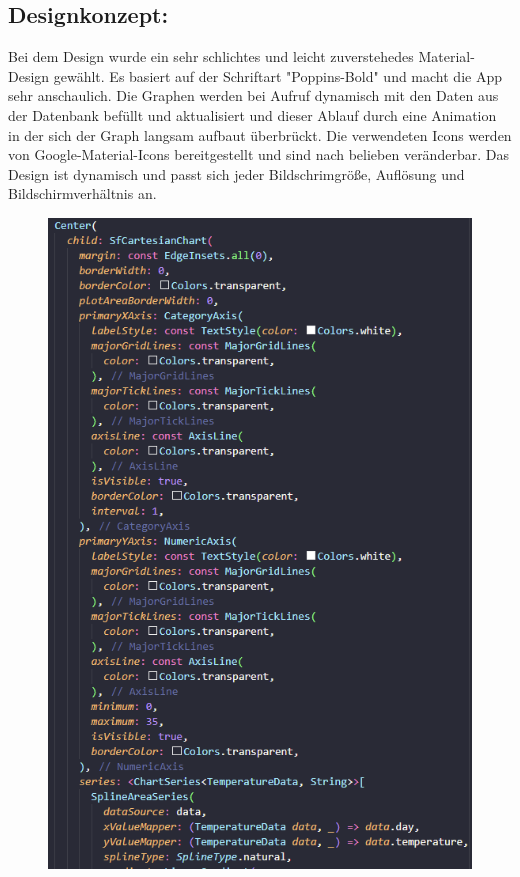 \subsection*{Designkonzept:}
Bei dem Design wurde ein sehr schlichtes und leicht zuverstehedes Material-Design gewählt.
Es basiert auf der Schriftart "Poppins-Bold" und macht die App sehr anschaulich. Die Graphen werden bei Aufruf
dynamisch mit den Daten aus der Datenbank befüllt und aktualisiert und dieser Ablauf durch eine Animation in der sich der Graph langsam aufbaut
überbrückt. Die verwendeten Icons werden von Google-Material-Icons bereitgestellt und sind nach belieben veränderbar.
Das Design ist dynamisch und passt sich jeder Bildschrimgröße, Auflösung und Bildschirmverhältnis an.
\begin{figure}[h!]
\begin{minipage}[c]{0.5\textwidth}
\includegraphics[width=\textwidth]{./pics/CodeSnippetChartDesign.PNG}

\end{minipage}
\end{figure}
